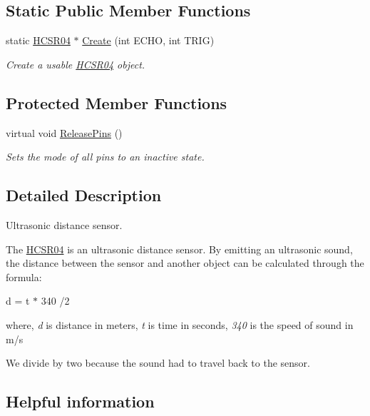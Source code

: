 \subsection*{Static Public Member Functions}
\begin{DoxyCompactItemize}
\item 
static \hyperlink{classraspboop_1_1HCSR04}{H\-C\-S\-R04} $\ast$ \hyperlink{classraspboop_1_1HCSR04_a7e89b5599fc715d1c903ff69f8aa2665}{Create} (int E\-C\-H\-O, int T\-R\-I\-G)
\begin{DoxyCompactList}\small\item\em Create a usable \hyperlink{classraspboop_1_1HCSR04}{H\-C\-S\-R04} object. \end{DoxyCompactList}\end{DoxyCompactItemize}
\subsection*{Protected Member Functions}
\begin{DoxyCompactItemize}
\item 
virtual void \hyperlink{classraspboop_1_1HCSR04_a194e41e6234c6c81bb9b022dc16b98ac}{Release\-Pins} ()
\begin{DoxyCompactList}\small\item\em Sets the mode of all pins to an inactive state. \end{DoxyCompactList}\end{DoxyCompactItemize}


\subsection{Detailed Description}
Ultrasonic distance sensor. 

The \hyperlink{classraspboop_1_1HCSR04}{H\-C\-S\-R04} is an ultrasonic distance sensor. By emitting an ultrasonic sound, the distance between the sensor and another object can be calculated through the formula\-:

d = t $\ast$ 340 /2

where, {\itshape d} is distance in meters, {\itshape t} is time in seconds, {\itshape 340} is the speed of sound in m/s

We divide by two because the sound had to travel back to the sensor.

\subsection*{Helpful information }


